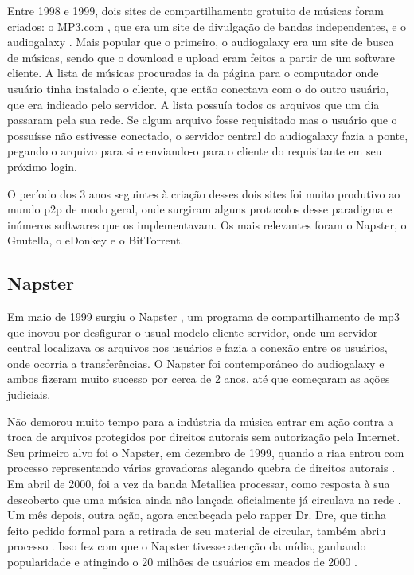 Entre 1998 e 1999, dois sites de compartilhamento gratuito de músicas foram criados: o
MP3.com \cite{site:wiki-mp3.com}, que era um site de divulgação de bandas independentes,
e o \gls{audiogalaxy} \cite{site:wiki-audiogalaxy.com,revista:pnp}. Mais popular que o
primeiro, o \gls*{audiogalaxy} era um site de busca de músicas, sendo que o download e
upload eram feitos a partir de um software cliente. A lista de músicas procuradas ia da
página para o computador onde usuário tinha instalado o cliente, que então conectava
com o do outro usuário, que era indicado pelo servidor. A lista possuía todos os
arquivos que um dia passaram pela sua rede. Se algum arquivo fosse requisitado mas o
usuário que o possuísse não estivesse conectado, o servidor central do
\gls*{audiogalaxy} fazia a ponte, pegando o arquivo para si e enviando-o para o cliente
do requisitante em seu próximo login.

O período dos 3 anos seguintes à criação desses dois sites foi muito produtivo ao
mundo \gls*{p2p} de modo geral, onde surgiram alguns protocolos desse paradigma e
inúmeros softwares que os implementavam. Os mais relevantes foram o Napster, o Gnutella,
o eDonkey e o BitTorrent.

\subsection{Napster}

Em maio de 1999 surgiu o Napster \cite{site:wiki-napster}, um programa de
compartilhamento de \gls*{mp3} que inovou por desfigurar o usual modelo
cliente-servidor, onde um servidor central localizava os arquivos nos usuários e fazia
a conexão entre os usuários, onde ocorria a transferências. O Napster foi contemporâneo
do \gls*{audiogalaxy} e ambos fizeram muito sucesso por cerca de 2 anos, até que
começaram as ações judiciais.

Não demorou muito tempo para a indústria da música entrar em ação contra a troca de
arquivos protegidos por direitos autorais sem autorização pela Internet. Seu primeiro
alvo foi o Napster, em dezembro de 1999, quando a \gls{riaa} entrou com processo
representando várias gravadoras alegando quebra de direitos autorais
\cite{site:napster-riaa}. Em abril de 2000, foi a vez da banda Metallica processar,
como resposta à sua descoberto que uma música ainda não lançada oficialmente já
circulava na rede \cite{site:napster-metallica,site:napster-metallica-orig}. Um mês
depois, outra ação, agora encabeçada pelo rapper Dr. Dre, que tinha feito pedido formal
para a retirada de seu material de circular, também abriu processo
\cite{site:napster-drdre-orig}. Isso fez com que o Napster tivesse atenção da mídia,
ganhando popularidade e atingindo o 20 milhões de usuários em meados de 2000
\cite{site:napster-use-2000}.


